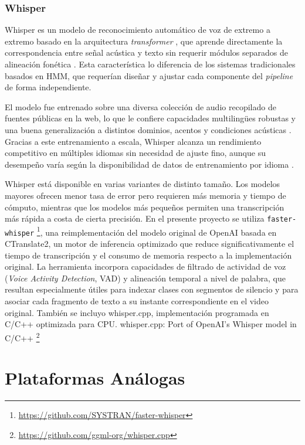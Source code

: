 \subsubsection{Whisper}
\label{subsection:2-Whisper}

Whisper es un modelo de reconocimiento automático de voz de extremo a extremo basado en la arquitectura \textit{transformer} \cite{vaswani2017attention}, que aprende directamente la correspondencia entre señal acústica y texto sin requerir módulos separados de alineación fonética \cite{radford2022robust}. Esta característica lo diferencia de los sistemas tradicionales basados en HMM, que requerían diseñar y ajustar cada componente del \textit{pipeline} de forma independiente.

El modelo fue entrenado sobre una diversa colección de audio recopilado de fuentes públicas en la web, lo que le confiere capacidades multilingües robustas y una buena generalización a distintos dominios, acentos y condiciones acústicas \cite{radford2022robust}. Gracias a este entrenamiento a escala, Whisper alcanza un rendimiento competitivo en múltiples idiomas sin necesidad de ajuste fino, aunque su desempeño varía según la disponibilidad de datos de entrenamiento por idioma \cite{radford2022robust}.

Whisper está disponible en varias variantes de distinto tamaño. Los modelos mayores ofrecen menor tasa de error pero requieren más memoria y tiempo de cómputo, mientras que los modelos más pequeños permiten una transcripción más rápida a costa de cierta precisión. En el presente proyecto se utiliza \texttt{faster-whisper} \cite{fasterwhisper} \footnote{\url{https://github.com/SYSTRAN/faster-whisper}}, una reimplementación del modelo original de OpenAI basada en CTranslate2, un motor de inferencia optimizado que reduce significativamente el tiempo de transcripción y el consumo de memoria respecto a la implementación original. La herramienta incorpora capacidades de filtrado de actividad de voz (\textit{Voice Activity Detection}, VAD) y alineación temporal a nivel de palabra, que resultan especialmente útiles para indexar clases con segmentos de silencio y para asociar cada fragmento de texto a su instante correspondiente en el video original. También se incluyo whisper.cpp, implementación programada en C/C++ optimizada para CPU. whisper.cpp: Port of OpenAI's Whisper model in C/C++ \footnote{\url{https://github.com/ggml-org/whisper.cpp}}

\section{Plataformas Análogas}
\label{section:2-Plataformas Análogas}


